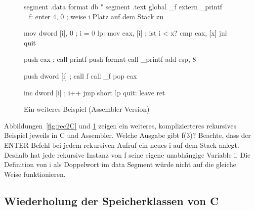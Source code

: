 \begin{figure}
\begin{AsmCodeListing}[frame=single, numbers=left, commandchars=\\\{\}]
 segment .data
 format  db "%
 segment .text
       global _f
       extern _printf
 _f:
       enter  4, 0          ; weise i Platz auf dem Stack zu

       mov    dword [i], 0  ; i = 0
 lp:
       mov    eax, [i]      ; ist i < x?
       cmp    eax, [x]
       jnl    quit

       push   eax           ; call printf
       push   format
       call   _printf
       add    esp, 8

       push   dword [i]     ; call f
       call   _f
       pop    eax

       inc    dword [i]     ; i++
       jmp    short lp
 quit:
       leave
       ret
\end{AsmCodeListing}
\caption{Ein weiteres Beispiel (Assembler Version)
\label{fig:rec2Asm}}
\end{figure}

Abbildungen~\ref{fig:rec2C} und \ref{fig:rec2Asm} zeigen ein
weiteres, komplizierteres rekursives Beispiel jeweils in C und
Assembler. Welche Ausgabe gibt {\code f(3)}? Beachte, dass der
{\code ENTER} Befehl bei jedem rekursiven Aufruf ein neues {\code i}
auf dem Stack anlegt. Deshalb hat jede rekursive Instanz von {\code
f} seine eigene unabh\"{a}ngige Variable {\code i}. Die Definition von
{\code i} als Doppelwort im {\code data} Segment w\"{u}rde nicht auf die
gleiche Weise funktionieren. 

\subsection{Wiederholung der Speicherklassen von C}

